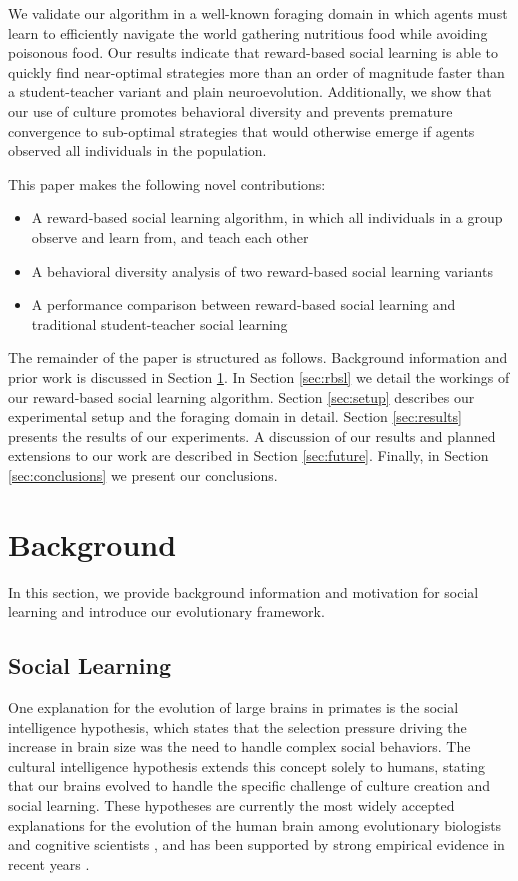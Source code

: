 \documentclass{acm_proc_article-sp}
\begin{document}
We validate our algorithm in a well-known foraging domain in which agents must learn to efficiently navigate the world gathering nutritious food while avoiding poisonous food. Our results indicate that reward-based social learning is able to quickly find near-optimal strategies more than an order of magnitude faster than a student-teacher variant and plain neuroevolution. Additionally, we show that our use of culture promotes behavioral diversity and prevents premature convergence to sub-optimal strategies that would otherwise emerge if agents observed all individuals in the population.

This paper makes the following novel contributions:
 
\begin{itemize}
\item A reward-based social learning algorithm, in which all individuals in a group observe and learn from, and teach each other
\item A behavioral diversity analysis of two reward-based social learning variants
\item A performance comparison between reward-based social learning and traditional student-teacher social learning
\end{itemize}
 
The remainder of the paper is structured as follows.
Background information and prior work is discussed in Section \ref{sec:background}.
In Section \ref{sec:rbsl} we detail the workings of our reward-based social learning algorithm.
Section \ref{sec:setup} describes our experimental setup and the foraging domain in detail.
Section \ref{sec:results} presents the results of our experiments.
A discussion of our results and planned extensions to our work are described in Section \ref{sec:future}.
Finally, in Section \ref{sec:conclusions} we present our conclusions.

\section{Background}
\label{sec:background}
In this section, we provide background information and motivation for social learning and introduce our evolutionary framework.

\subsection*{Social Learning}

One explanation for the evolution of large brains in primates is the social intelligence hypothesis, which states that the selection pressure driving the increase in brain size was the need to handle complex social behaviors. The cultural intelligence hypothesis extends this concept solely to humans, stating that our brains evolved to handle the specific challenge of culture creation and social learning. These hypotheses are currently the most widely accepted explanations for the evolution of the human brain among evolutionary biologists and cognitive scientists \cite{holekamp2007questioning}, and has been supported by strong empirical evidence in recent years \cite{herrmann2007humans}.
\end{document}

